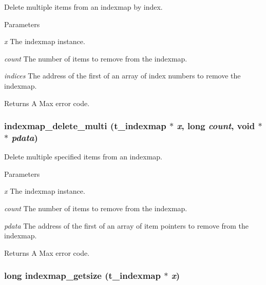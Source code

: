 Delete multiple items from an indexmap by index. 
\begin{DoxyParams}{Parameters}
\item[{\em x}]The indexmap instance. \item[{\em count}]The number of items to remove from the indexmap. \item[{\em indices}]The address of the first of an array of index numbers to remove the indexmap. \end{DoxyParams}
\begin{DoxyReturn}{Returns}
A Max error code. 
\end{DoxyReturn}
\hypertarget{group__indexmap_ga657452348b363af34acfaeff3a536578}{
\subsubsection[{indexmap\_\-delete\_\-multi}]{ indexmap\_\-delete\_\-multi ({\bf t\_\-indexmap} $\ast$ {\em x}, \/  long {\em count}, \/  void $\ast$$\ast$ {\em pdata})}}
\label{group__indexmap_ga657452348b363af34acfaeff3a536578}


Delete multiple specified items from an indexmap. 
\begin{DoxyParams}{Parameters}
\item[{\em x}]The indexmap instance. \item[{\em count}]The number of items to remove from the indexmap. \item[{\em pdata}]The address of the first of an array of item pointers to remove from the indexmap. \end{DoxyParams}
\begin{DoxyReturn}{Returns}
A Max error code. 
\end{DoxyReturn}
\hypertarget{group__indexmap_ga95b1d9e5d527db93141e56b86413aad2}{
\subsubsection[{indexmap\_\-getsize}]{\setlength{\rightskip}{0pt plus 5cm}long indexmap\_\-getsize ({\bf t\_\-indexmap} $\ast$ {\em x})}}
\label{group__indexmap_ga95b1d9e5d527db93141e56b86413aad2}



